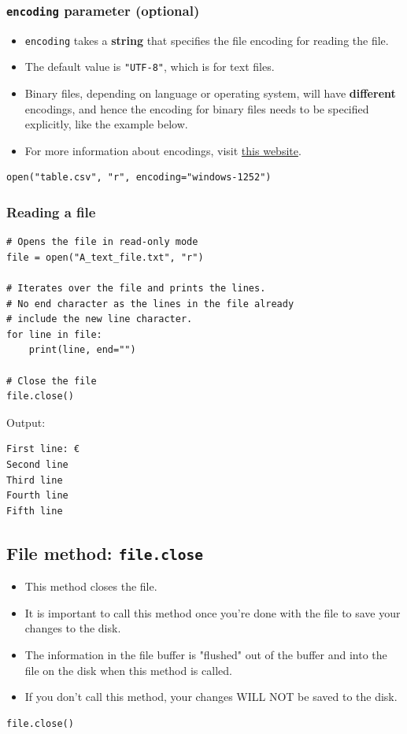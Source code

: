 \documentclass[11pt]{article}
\begin{document}
\subsubsection{\texttt{encoding} parameter (optional)}
\label{sec:org2f37476}
\begin{itemize}
\item \texttt{encoding} takes a \textbf{string} that specifies the file encoding for reading the file.
\item The default value is \texttt{"UTF-8"}, which is for text files.
\item Binary files, depending on language or operating system, will have \textbf{different} encodings, and hence the encoding for binary files needs to be specified explicitly, like the example below.
\item For more information about encodings, visit \href{http://getpython3.com/diveintopython3/strings.html\#boring-stuff}{this website}.
\end{itemize}
\begin{verbatim}
open("table.csv", "r", encoding="windows-1252")
\end{verbatim}

\subsubsection{Reading a file}
\label{sec:orgc445f60}
\begin{verbatim}
# Opens the file in read-only mode
file = open("A_text_file.txt", "r")

# Iterates over the file and prints the lines.
# No end character as the lines in the file already
# include the new line character.
for line in file:
    print(line, end="")

# Close the file
file.close()
\end{verbatim}

 \noindent Output:

\begin{verbatim}
First line: €
Second line
Third line
Fourth line
Fifth line
\end{verbatim}


 \newpage

\subsection{File method: \texttt{file.close}}
\label{sec:orga0a199d}
\begin{itemize}
\item This method closes the file.
\item It is important to call this method once you're done with the file to save your changes to the disk.
\item The information in the file buffer is "flushed" out of the buffer and into the file on the disk when this method is called.
\item If you don't call this method, your changes WILL NOT be saved to the disk.
\end{itemize}
\begin{verbatim}
file.close()
\end{verbatim}
\end{document}
